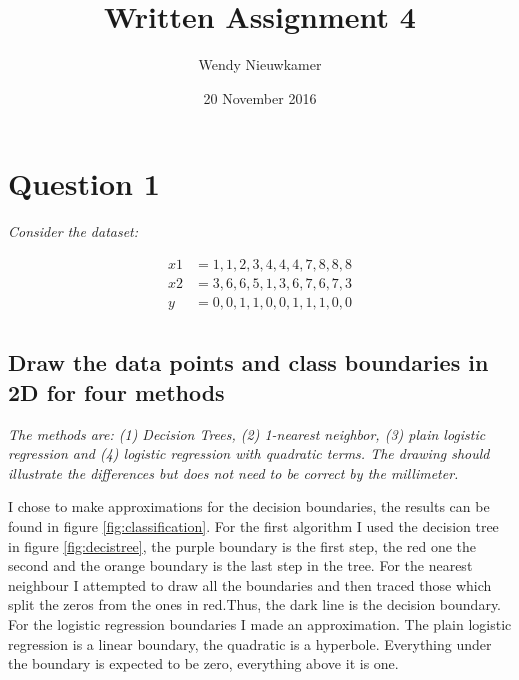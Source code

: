 \documentclass{article}
\title {Written Assignment 4}
\date{20 November 2016}
\author{Wendy Nieuwkamer}
\begin{document}
\maketitle

\section{Question 1}
\textit{Consider the dataset:}

\begin{align*}
x1 &= {1, 1, 2, 3, 4, 4, 4, 7, 8, 8, 8}\\
x2 &= {3, 6, 6, 5, 1, 3, 6, 7, 6, 7, 3}\\
y &= {0, 0, 1, 1, 0, 0, 1, 1, 1, 0, 0}\\
\end{align*}

\subsection{Draw the data points and class boundaries in 2D for four methods}
\textit{The methods are: (1) Decision Trees, (2) 1-nearest neighbor, (3) plain logistic regression and (4) logistic
regression with quadratic terms. The drawing should illustrate the differences but does
not need to be correct by the millimeter.}

I chose to make approximations for the decision boundaries, the results can be found in figure \ref{fig:classification}. For the first algorithm I
used the decision tree in figure \ref{fig:decistree}, the purple boundary is the first step, the red one the second and the orange boundary is the last step in the tree. For the nearest neighbour I attempted to draw all the boundaries and then traced those which split the zeros from the ones in red.Thus, the dark line is the decision boundary. For the logistic regression boundaries I made an approximation. The plain logistic regression is a linear boundary, the quadratic is a hyperbole. Everything under the boundary is expected to be zero, everything above it is one.
\end{document}
